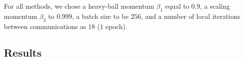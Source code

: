 \documentclass[sn-mathphys,Numbered]{sn-jnl}%
\renewcommand{\|}{\parallel}
\renewcommand {\*} {\ast}
\begin{document}
For all methods, we chose a heavy-ball momentum $\beta_1$ equal to $0.9$, a scaling momentum $\beta_2$ to $0.999$, a batch size to be $256$, and a number of local iterations between communications as $18$ ($1$ epoch).

 
\subsection{Results}

\end{document}
